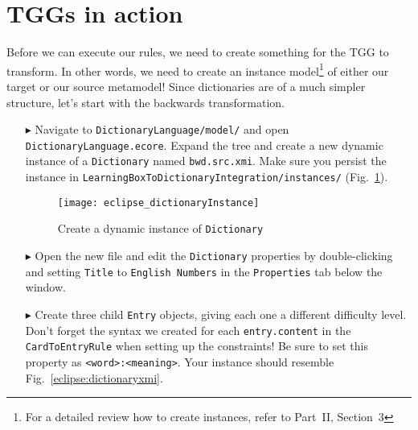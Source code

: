 \newpage
\section{TGGs in action}
\genHeader
\label{sect:TGGs_in_Action}

Before we can execute our rules, we need to create something for the TGG to transform. In other words, we need to create an instance model\footnote{For a
detailed review how to create instances, refer to Part~II, Section~3} of either our target or our source metamodel! Since dictionaries are
of a much simpler structure, let's start with the backwards transformation.

\begin{itemize}

\item[$\blacktriangleright$] Navigate to \texttt{Dictionary\-Language/model/} and open \texttt{Dictio\-nary\-Lang\-uage.ecore}. Expand the tree and create a new
dynamic instance of a \texttt{Dictionary} named \texttt{bwd.src.xmi}. Make sure you persist the instance in
\texttt{Learn\-ing\-Box\-To\-Dictionary\-In\-te\-gra\-tion/in\-stan\-ces/} (Fig.~\ref{eclipse:create_instance_dict}).

\begin{figure}[htbp]
\begin{center}
  \texttt{[image: eclipse\_dictionaryInstance]}
  \caption{Create a dynamic instance of \texttt{Dictionary}}
  \label{eclipse:create_instance_dict}
\end{center}
\end{figure}

\newpage

\item[$\blacktriangleright$] Open the new file and edit the \texttt{Dictionary} properties by double-clicking and setting \texttt{Title} to \texttt{English
Numbers} in the \texttt{Properties} tab below the window.

\vspace{0.5cm}

\item[$\blacktriangleright$] Create three child \texttt{Entry} objects, giving each one a different difficulty level. Don't forget the syntax we created for
each \texttt{entry.content} in the \texttt{CardToEntryRule} when setting up the constraints! Be sure to set this property as \texttt{<word>:<meaning>}. Your
instance should resemble Fig.~\ref{eclipse:dictionaryxmi}.

\vspace{0.5cm}


\end{itemize}
